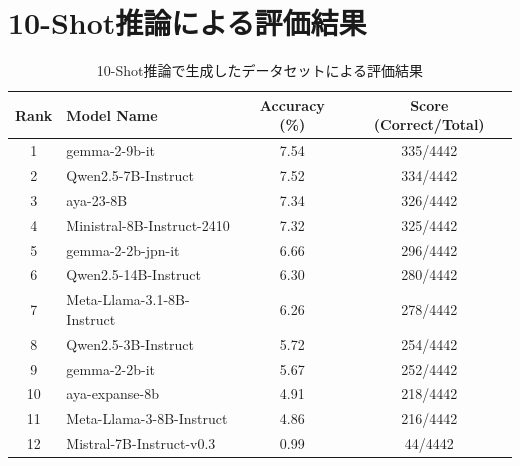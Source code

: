 \documentclass[a4paper,11pt]{jreport}
\begin{document}
\section{10-Shot推論による評価結果}
\begin{table}[hbtp]
  \centering
  \caption{10-Shot推論で生成したデータセットによる評価結果}
  \label{tab:appendix_10_shot}
  \begin{tabular}{clcc}
    \hline
    Rank & Model Name & Accuracy (\%) & Score (Correct/Total) \\
    \hline
    1 & gemma-2-9b-it & 7.54 & 335/4442 \\
    2 & Qwen2.5-7B-Instruct & 7.52 & 334/4442 \\
    3 & aya-23-8B & 7.34 & 326/4442 \\
    4 & Ministral-8B-Instruct-2410 & 7.32 & 325/4442 \\
    5 & gemma-2-2b-jpn-it & 6.66 & 296/4442 \\
    6 & Qwen2.5-14B-Instruct & 6.30 & 280/4442 \\
    7 & Meta-Llama-3.1-8B-Instruct & 6.26 & 278/4442 \\
    8 & Qwen2.5-3B-Instruct & 5.72 & 254/4442 \\
    9 & gemma-2-2b-it & 5.67 & 252/4442 \\
    10 & aya-expanse-8b & 4.91 & 218/4442 \\
    11 & Meta-Llama-3-8B-Instruct & 4.86 & 216/4442 \\
    12 & Mistral-7B-Instruct-v0.3 & 0.99 & 44/4442 \\
    \hline
  \end{tabular}
\end{table}
\end{document}
